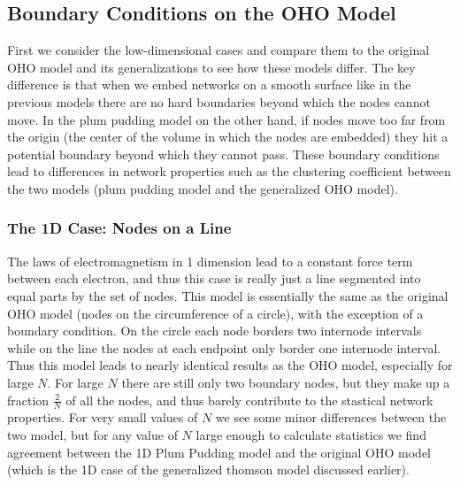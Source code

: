 \documentclass[aps,pre,reprint,superscriptaddress,amsmath,amssymb]{revtex4-1}
\begin{document}


\subsection{Boundary Conditions on the OHO Model}
First we consider the low-dimensional cases and compare them to the original OHO model and its generalizations to see how these models differ.
The key difference is that when we embed networks on a smooth surface like in the previous models there are no hard boundaries beyond which the nodes cannot move.
In the plum pudding model on the other hand, if nodes move too far from the origin (the center of the volume in which the nodes are embedded) they hit a potential boundary beyond which they cannot pass.
These boundary conditions lead to differences in network properties such as the clustering coefficient between the two models (plum pudding model and the generalized OHO model).

\subsubsection{The 1D Case: Nodes on a Line}
The laws of electromagnetism in 1 dimension lead to a constant force term between each electron, and thus this case is really just a line segmented into equal parts by the set of nodes. 
This model is essentially the same as the original OHO model (nodes on the circumference of a circle), with the exception of a boundary condition. 
On the circle each node borders two internode intervals while on the line the nodes at each endpoint only border one internode interval.
Thus this model leads to nearly identical results as the OHO model, especially for large $N$.
For large $N$ there are still only two boundary nodes, but they make up a fraction $\frac{2}{N}$ of all the nodes, and thus barely contribute to the stastical network properties.
For very small values of $N$ we see some minor differences between the two model, but for any value of $N$ large enough to calculate statistics we find agreement between the 1D Plum Pudding model and the original OHO model (which is the 1D case of the generalized thomson model discussed earlier).

\end{document}
